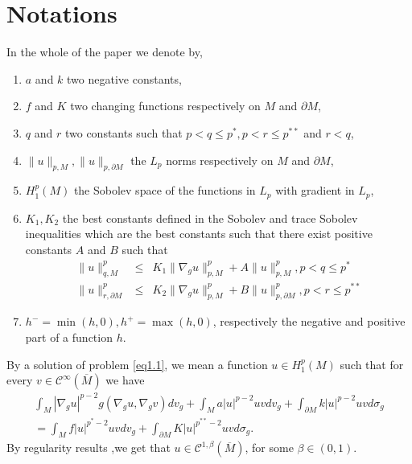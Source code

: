 \documentclass{Tran-l}
\theoremstyle{definition}
\theoremstyle{remark}
\numberwithin{equation}{section}
\begin{document}
\section{Notations}
In the whole of the paper we denote by,
\begin{enumerate}
  \item $a$ and $k$ two negative constants,
\item $f$ and $K$ two changing functions respectively on $M$ and $\partial
M$,
\item $q$ and $r$ two constants such that $p<q\leq p^*, p<r\leq
p^{**}$ and $r<q$,
  \item $\|u\|_{p,M},\|u\|_{p,\partial M}$ the $L_p$ norms
respectively on $M$ and $\partial M$,
\item $H_1^p(M)$ the Sobolev space of the functions in $L_p$ with gradient in $L_p$,
\item $K_1, K_2$ the best constants defined in
the Sobolev and trace Sobolev inequalities which are the best
constants such that there exist positive constants $A$ and $B$ such
that
\begin{eqnarray*}
\|u\|_{q,M}^p&\leq&K_1\|\nabla_gu\|_{p,M}^p+A\|u\|_{p,M}^p,
p<q\leq p^* \\
\|u\|_{r,\partial M}^p &\leq&K_2
\|\nabla_gu\|_{p,M}^p+B\|u\|_{p,\partial M}^p, p< r\leq p^{**}
\end{eqnarray*}
\item $h^-=\min(h,0),h^+=\max(h,0)$, respectively the negative and
positive part of a function $h$.
\end{enumerate}
By a solution of problem \eqref{eq1.1}, we mean a function $u\in
H^p_1(M)$ such that for every $v\in {\mathcal{C}}^\infty(\overline M)$ we have
\begin{eqnarray*}
  &\int_M|\nabla_gu|^{p-2}g(\nabla_gu,\nabla_gv)dv_g+
\int_Ma|u|^{p-2}uvdv_g+\int_{\partial M}k|u|^{p-2}uvd\sigma_g& \\
  &=\int_Mf|u|^{p^*-2}uvdv_g+\int_{\partial M}K|u|^{p^{**}-2}uv
d\sigma_g.&
 \end{eqnarray*}
By regularity results \cite{Lieberman},we get that
$u\in{\mathcal{C}}^{1,\beta}(\overline M)$, for some $\beta\in(0,1)$.
\end{document}

